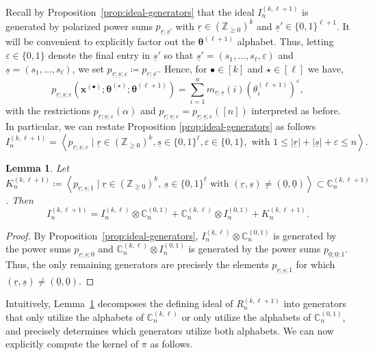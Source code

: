 \documentclass[11pt, reqno]{amsart}
\newtheorem{lemma}[theorem]{Lemma}
\theoremstyle{definition}
\theoremstyle{remark}
\numberwithin{equation}{section}
\newcommand{\0}{\emptyset}
\newcommand{\Z}{\mathbb{Z}}
\newcommand{\C}{\mathbb{C}}
\renewcommand{\r}{\underline{r}}
\newcommand{\s}{\underline{s}}
\begin{document}
Recall by Proposition~\ref{prop:ideal-generators} that the ideal $I_n^{(k,\ell+1)}$ is generated by polarized power sums $p_{\r;\s'}$ with $\r \in (\Z_{\geq 0})^k$ and $\s' \in \{0,1\}^{\ell+1}$. 
It will be convenient to explicitly factor out the $\bm{\theta}^{(\ell+1)}$ alphabet. 
Thus, letting $\varepsilon \in \{0,1\}$ denote the final entry in $\s'$ so that $\s' = (s_1,\ldots, s_\ell, \varepsilon)$ and $\s = (s_1,\ldots, s_\ell)$, we set $p_{\r;\s;\varepsilon}\coloneqq p_{\r;\s'}$. Hence, for $\bullet \in [k]$ and $\star \in [\ell]$ we have,
\begin{equation}
    p_{\r;\s;\varepsilon}\left(\bm{x}^{(\bullet)};\bm{\theta}^{(\star)};\bm{\theta}^{(\ell+1)}\right)  = \sum_{i=1}^n m_{\r;\s}(i) \left(\theta_i^{(\ell+1)}\right)^{\varepsilon},
\end{equation}
with the restrictions $p_{\r;\s;\varepsilon}(\alpha)$ and $p_{\r;\s;\varepsilon} = p_{\r;\s;\varepsilon}([n])$ interpreted as before.
In particular, we can restate Proposition \ref{prop:ideal-generators} as follows
\[
I_n^{(k,\ell+1)} = \left\langle p_{\r;\s;\varepsilon} \mid 
\r \in (\Z_{\geq 0})^k, \s \in \{0,1\}^\ell, \varepsilon \in \{ 0,1\}, \text{ with }
1 \leq |\r|+|\s| + \varepsilon \leq n \right\rangle.
\]

\begin{lemma}
    \label{lem:Ideal-decomposition}
    Let $K_n^{(k,\ell+1)} \coloneqq 
    \left\langle p_{\r;\s;1}
    \mid  \r \in (\mathbb{Z}_{\geq 0})^{k},\, 
    \s \in \{0,1\}^{\ell} \text{ with  } (\r,\s) \neq (\underline{0}, \underline{0}) \right \rangle \subset \C_n^{(k,\ell+1)}$. 
    Then
    \[
        I_n^{(k,\ell+1)} = 
        I_n^{(k,\ell)} \otimes \C_n^{(0,1)} + 
        \C_n^{(k,\ell)} \otimes I_n^{(0,1)} + 
        K_n^{(k,\ell+1)}. 
    \]
\end{lemma}

\begin{proof}
By Proposition~\ref{prop:ideal-generators}, $I_n^{(k,\ell)}\otimes \C_n^{(0,1)}$ is generated by the power sums $p_{\r;\s;0}$ and $\C_n^{(k,\ell)} \otimes I_n^{(0,1)}$ is generated by the power sums $p_{\underline{0};\underline{0};1}$. 
Thus, the only remaining generators are precisely the elements $p_{\r;\s;1}$ for which $(\r,\s ) \neq (\underline{0},\underline{0})$. 
\end{proof}

Intuitively, Lemma~\ref{lem:Ideal-decomposition} decomposes the defining ideal of 
$R_n^{(k,\ell+1)}$ into generators that only utilize the alphabets of $\C_n^{(k,\ell)}$ 
or only utilize the alphabets of $\C_n^{(0,1)}$, and precisely determines which generators 
utilize both alphabets. We can now explicitly compute the kernel of $\pi$ as follows. 
\end{document}
